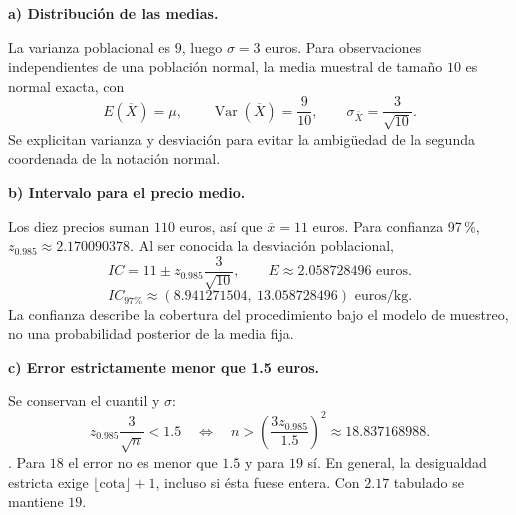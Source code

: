 \textbf{a) Distribución de las medias.}\par\nopagebreak[4]
La varianza poblacional es $9$, luego $\sigma=3$ euros. Para observaciones independientes de una población normal, la media muestral de tamaño $10$ es normal exacta, con
\[
\boxed{E(\overline X)=\mu,\qquad
\operatorname{Var}(\overline X)=\frac9{10},\qquad
\sigma_{\overline X}=\frac3{\sqrt{10}}.}
\]
Se explicitan varianza y desviación para evitar la ambigüedad de la segunda coordenada de la notación normal.

\textbf{b) Intervalo para el precio medio.}\par\nopagebreak[4]
Los diez precios suman $110$ euros, así que $\overline x=11$ euros. Para confianza 97\,\%, $z_{0.985}\approx2.170090378$. Al ser conocida la desviación poblacional,
\[
IC=11\pm z_{0.985}\frac3{\sqrt{10}},\qquad E\approx2.058728496\text{ euros}.
\]
\[
\boxed{IC_{\text{97\%}}\approx(8.941271504,\ 13.058728496)\text{ euros/kg}.}
\]
La confianza describe la cobertura del procedimiento bajo el modelo de muestreo, no una probabilidad posterior de la media fija.

\textbf{c) Error estrictamente menor que 1.5 euros.}\par\nopagebreak[4]
Se conservan el cuantil y $\sigma$:
\[
z_{0.985}\frac3{\sqrt n}<1.5
\quad\Longleftrightarrow\quad
n>\left(\frac{3z_{0.985}}{1.5}\right)^2
\approx18.837168988.
\]
. Para $18$ el error no es menor que $1.5$ y para $19$ sí. En general, la desigualdad estricta exige $\lfloor\text{cota}\rfloor+1$, incluso si ésta fuese entera. Con $2.17$ tabulado se mantiene $19$.
